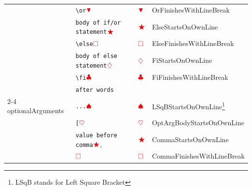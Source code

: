 \begin{longtable}{llll}
                                         & \verb!\or!$\color{red}\blacktriangledown$                              & $\color{red}\blacktriangledown$              & OrFinishesWithLineBreak                                           \\
                                         & \verb!body of if/or statement!$\color{red}\bigstar$              & $\color{red}\bigstar$                  & ElseStartsOnOwnLine                                               \\
                                         & \verb!\else!$\color{red}\square$                          & $\color{red}\square$            & ElseFinishesWithLineBreak                                         \\
                                         & \verb!body of else statement!$\color{red}\diamondsuit$                & $\color{red}\diamondsuit$                   & FiStartsOnOwnLine                                                 \\
                                         & \verb!\fi!$\color{red}\clubsuit$                             & $\color{red}\clubsuit$             & FiFinishesWithLineBreak                                           \\
                                         & \verb!after words!                                                &                                         &                                                                   \\
  \cmidrule{2-4}
  optionalArguments                      & \verb!...!$\color{red}\spadesuit$                                 & $\color{red}\spadesuit$                 & LSqBStartsOnOwnLine\footnote{LSqB stands for Left Square Bracket} \\
                                         & \verb![!$\color{red}\heartsuit$                                    & $\color{red}\heartsuit$                  & OptArgBodyStartsOnOwnLine                                         \\
                                         & \verb!value before comma!$\color{red}\bigstar$,                  & $\color{red}\bigstar$                  & CommaStartsOnOwnLine                                              \\
                                         & $\color{red}\square$                                      & $\color{red}\square$            & CommaFinishesWithLineBreak                                        \\

\end{longtable}
